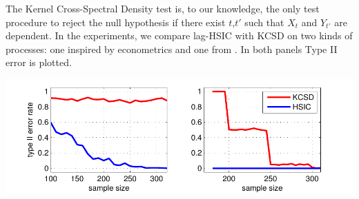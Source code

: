 \documentclass[landscape,a0]{a0poster_csml_v2}
\begin{document}
\begin{poster}
\begin{PosterColumn}
\begin{minipage}[c]{0.4\textwidth}
The Kernel Cross-Spectral Density  \cite{besserve_statistical_2013} test is, to our knowledge, the only test procedure to reject the null hypothesis if there exist $t$,$t'$ such that $X_t$ and $Y_{t'}$ are dependent. In the experiments, we compare lag-HSIC with KCSD on two kinds of processes: one  inspired by econometrics and one from \cite{besserve_statistical_2013}. In both panels Type II error is plotted.
\end{minipage}
\begin{minipage}[c]{0.6\textwidth}
\includegraphics[width=\textwidth]{../img/varAndPhase.pdf} 
\end{minipage}

\small




\end{PosterColumn}

\end{poster}
\end{document}

